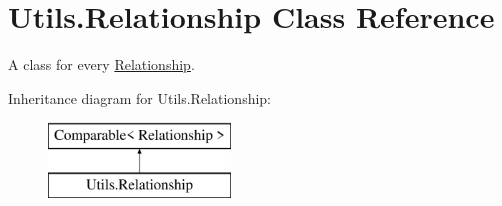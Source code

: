 \hypertarget{class_utils_1_1_relationship}{}\section{Utils.\+Relationship Class Reference}
\label{class_utils_1_1_relationship}


A class for every \hyperlink{class_utils_1_1_relationship}{Relationship}.  


Inheritance diagram for Utils.\+Relationship\+:\begin{figure}[H]
\begin{center}
\leavevmode
\includegraphics[height=2.000000cm]{class_utils_1_1_relationship}
\end{center}
\end{figure}
